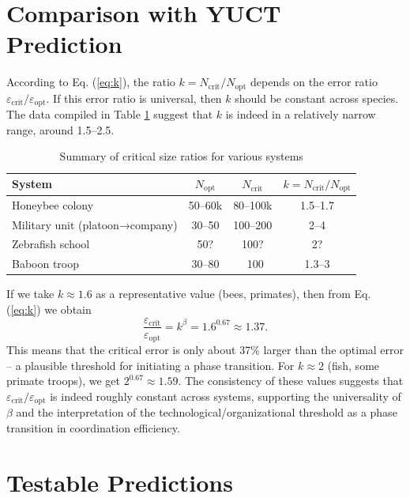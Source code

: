 \documentclass[12pt]{article}
\theoremstyle{remark}
\begin{document}
	\section{Comparison with YUCT Prediction}
	\label{sec:comparison}
	
	According to Eq. (\ref{eq:k}), the ratio $k = N_{\text{crit}}/N_{\text{opt}}$ depends on the error ratio $\varepsilon_{\text{crit}}/\varepsilon_{\text{opt}}$. If this error ratio is universal, then $k$ should be constant across species. The data compiled in Table \ref{tab:summary} suggest that $k$ is indeed in a relatively narrow range, around 1.5–2.5.
	
	\begin{table}[htbp]
		\centering
		\caption{Summary of critical size ratios for various systems}
		\label{tab:summary}
		\begin{tabular}{lccc}
			\toprule
			\textbf{System} & $N_{\text{opt}}$ & $N_{\text{crit}}$ & $k = N_{\text{crit}}/N_{\text{opt}}$ \\
			\midrule
			Honeybee colony & 50–60k & 80–100k & 1.5–1.7 \\
			Military unit (platoon→company) & 30–50 & 100–200 & 2–4 \\
			Zebrafish school & 50? & 100? & 2? \\
			Baboon troop & 30–80 & ~100 & 1.3–3 \\
			\bottomrule
		\end{tabular}
	\end{table}
	
	If we take $k \approx 1.6$ as a representative value (bees, primates), then from Eq. (\ref{eq:k}) we obtain
	\[
	\frac{\varepsilon_{\text{crit}}}{\varepsilon_{\text{opt}}} = k^{\beta} = 1.6^{0.67} \approx 1.37.
	\]
	This means that the critical error is only about 37\% larger than the optimal error – a plausible threshold for initiating a phase transition. For $k \approx 2$ (fish, some primate troops), we get $2^{0.67} \approx 1.59$. The consistency of these values suggests that $\varepsilon_{\text{crit}}/\varepsilon_{\text{opt}}$ is indeed roughly constant across systems, supporting the universality of $\beta$ and the interpretation of the technological/organizational threshold as a phase transition in coordination efficiency.
	
	\section{Testable Predictions}
	\label{sec:predictions}
	
\end{document}
